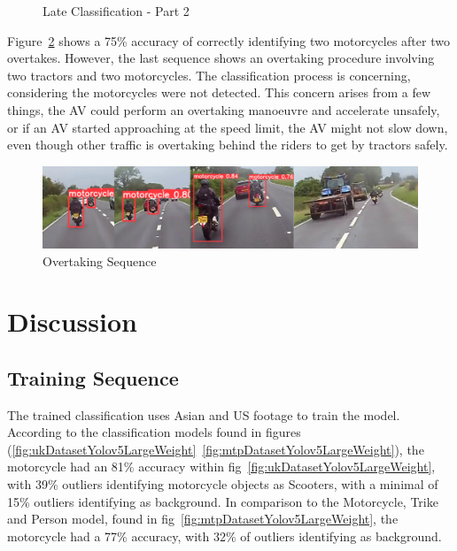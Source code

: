 \documentclass[conference]{IEEEtran}
\begin{document}
\begin{figure}[h]
\begin{minipage}{0.15\textwidth}
			\caption{Late Classification - Part 2}
			\label{fig:lateClassificationP2}
		\end{minipage}
	\end{figure}	

	Figure~\ref{fig:overtakingSequence} shows a 75\% accuracy of correctly identifying two motorcycles after two overtakes. However, the last sequence shows an overtaking procedure involving two tractors and two motorcycles. The classification process is concerning, considering the motorcycles were not detected. This concern arises from a few things, the AV could perform an overtaking manoeuvre and accelerate unsafely, or if an AV started approaching at the speed limit, the AV might not slow down, even though other traffic is overtaking behind the riders to get by tractors safely.
	\begin{figure}[h]
		\centering
		\includegraphics[width=\columnwidth]{Figures/motorcycle_overtaking_sequence.png}
		\caption{Overtaking Sequence}
		\label{fig:overtakingSequence}
	\end{figure}
\section{Discussion}
	\subsection{Training Sequence}
	The trained classification uses Asian and US footage to train the model. According to the classification models found in figures (\ref{fig:ukDatasetYolov5LargeWeight}~\ref{fig:mtpDatasetYolov5LargeWeight}), the motorcycle had an 81\% accuracy within fig~\ref{fig:ukDatasetYolov5LargeWeight}, with 39\% outliers identifying motorcycle objects as Scooters, with a minimal of 15\% outliers identifying as background. In comparison to the Motorcycle, Trike and Person model, found in fig~\ref{fig:mtpDatasetYolov5LargeWeight}, the motorcycle had a 77\% accuracy, with 32\% of outliers identifying as background.
\end{document}
